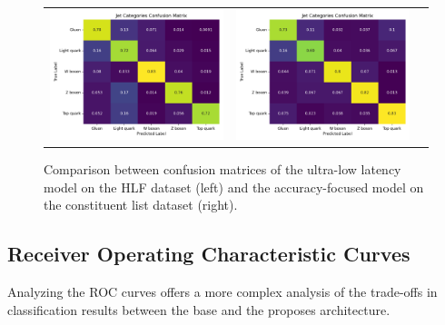 \begin{figure}[!hpt]
  \centering
  \begin{tabular}{ccc}
      {\includegraphics[width=0.48\columnwidth]{../logs/confusion_matrix_hlf.png}} &
      {\includegraphics[width=0.48\columnwidth]{../logs/confusion_matrix_constituent.png}}
  \end{tabular}
  \caption{Comparison between confusion matrices of the ultra-low latency model on the HLF dataset (left) and the accuracy-focused model on the constituent list dataset (right).}
  \label{fig:confusion-matrix}
\end{figure}

\subsection{Receiver Operating Characteristic Curves}
Analyzing the ROC curves offers a more complex analysis of the trade-offs in classification results between the base and the proposes architecture.

